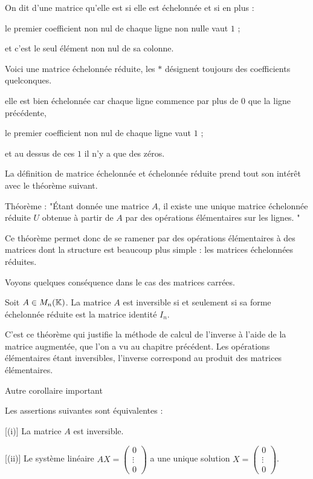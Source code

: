 \change
On dit d'une matrice qu'elle est  si elle est échelonnée et si en plus : 

le premier coefficient non nul de chaque ligne non nulle vaut $1$ ;

et c'est le seul élément non nul de sa colonne.

\change
Voici une matrice échelonnée réduite, les $*$ désignent toujours des coefficients quelconques.

elle est bien échelonnée car chaque ligne commence par plus de $0$ que la ligne précédente,

le premier  coefficient non nul de chaque ligne vaut $1$ ;

et au dessus de ces $1$ il n'y a que des zéros.




\diapo

La définition de matrice échelonnée et échelonnée réduite prend tout son intérêt avec le théorème suivant.


Théorème :
"\'Etant donnée une matrice $A$, il existe une unique  
matrice échelonnée réduite $U$ obtenue à partir de $A$ 
par des opérations élémentaires sur les lignes. "

Ce théorème permet donc de se ramener par des opérations élémentaires
à des matrices dont la structure est beaucoup plus simple :
les matrices échelonnées réduites.


\diapo

Voyons quelques conséquence dans le cas des matrices carrées.


Soit $A\in M_{n}(\mathbb{K})$.
La matrice $A$ est inversible si et seulement si sa forme échelonnée réduite 
est la matrice identité $I_n$.


C'est ce théorème qui justifie la méthode de calcul de l'inverse 
à l'aide de la matrice augmentée, que l'on a vu au chapitre précédent. Les opérations élémentaires étant inversibles, l'inverse correspond au produit des matrices élémentaires.

\change
Autre corollaire important

Les assertions suivantes sont équivalentes :

[(i)] La matrice $A$ est inversible.
  
[(ii)] Le système linéaire $AX=\left(\begin{smallmatrix} 0 \\ \vdots \\ 0\end{smallmatrix}\right)$ 
a une unique solution 
  $X=\left(\begin{smallmatrix} 0 \\ \vdots \\ 0\end{smallmatrix}\right)$.
             
